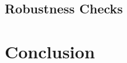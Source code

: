 \begin{refsection}
\subsection{Robustness Checks}

\section{Conclusion}

\printbibliography
\end{refsection}